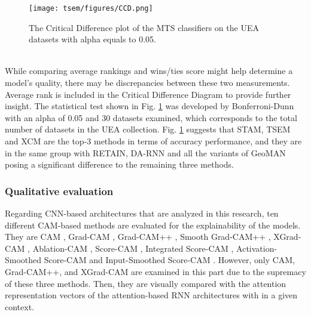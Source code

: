 \documentclass{svproc}
\begin{document}
\begin{figure}[h!]
\centering
\texttt{[image: tsem/figures/CCD.png]}
\caption{The Critical Difference plot of the MTS classifiers on the UEA datasets with alpha equals to
0.05.}
\label{fig:CCD}
\end{figure}
\\

While comparing average rankings and wins/ties score might help determine a model's quality, there may be discrepancies between these two measurements. Average rank is  included in the Critical  Difference Diagram to provide further insight. The statistical test shown in Fig. \ref{fig:CCD} was developed by Bonferroni-Dunn with an alpha of 0.05 and 30 datasets examined, which corresponds to the total number of datasets in the UEA collection. Fig. \ref{fig:CCD} suggests that STAM, TSEM and XCM are the top-3 methods in terms of accuracy performance, and they are in the same group with RETAIN, DA-RNN and all the variants of GeoMAN posing a significant difference to the remaining three methods. 
\subsubsection{Qualitative evaluation}
Regarding CNN-based architectures that are analyzed in this research, ten different CAM-based methods are evaluated for the explainability of the models. They are CAM \cite{zhou2016learning}, Grad-CAM \cite{selvaraju2017grad}, Grad-CAM++ \cite{chattopadhay2018grad}, Smooth Grad-CAM++ \cite{omeiza2019smooth}, XGrad-CAM \cite{fu2020axiom}, Ablation-CAM \cite{ramaswamy2020ablation}, Score-CAM \cite{wang2020score}, Integrated Score-CAM \cite{naidu2020cam}, Activation-Smoothed Score-CAM \cite{wang2020ss} and Input-Smoothed Score-CAM \cite{wang2020ss}. However, only CAM, Grad-CAM++, and XGrad-CAM are examined in this part due to the supremacy of these three methods. Then, they are visually compared with the attention representation vectors of the attention-based RNN architectures with in a given context. 
\end{document}
